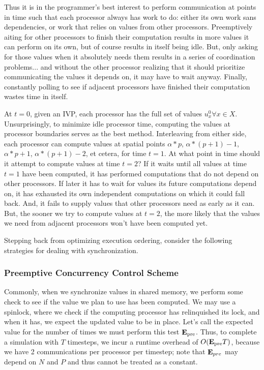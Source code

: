 Thus it is in the programmer's best interest to perform communication at points
in time such that each processor always has work to do: either its own work sans
dependencies, or work that relies on values from other processors. Preemptively
aiting for other processors to finish their computation results in more values
it can perform on its own, but of course results in itself being idle. But, only
asking for those values when it absolutely needs them results in a series of
coordination problems... and without the other processor realizing that it
should prioritize communicating the values it depends on, it may have to wait
anyway. Finally, constantly polling to see if adjacent processors have finished
their computation wastes time in itself.

At $t=0$, given an IVP, each processor has the full set of values $u^{0}_{x}
\forall x \in X$. Unsurprisingly, to minimize idle processor time, computing the
values at processor boundaries serves as the best method. Interleaving from
either side, each processor can compute values at spatial points $\alpha*p$,
$\alpha*(p+1) - 1$, $\alpha*p + 1$, $\alpha*(p+1) - 2$, et cetera, for time $t =
1$. At what point in time should it attempt to compute values at time $t = 2$?
If it waits until all values at time $t = 1$ have been computed, it has
performed computations that do not depend on other processors. If later it has
to wait for values its future computations depend on, it has exhausted its own
independent computations on which it could fall back. And, it fails to supply
values that other processors need as early as it can. But, the sooner we try to
compute values at $t = 2$, the more likely that the values we need from adjacent
processors won't have been computed yet.

Stepping back from optimizing execution ordering, consider the following
strategies for dealing with synchronization.

\subsubsection{Preemptive Concurrency Control Scheme}
Commonly, when we synchronize values in shared memory, we perform some check to
see if the value we plan to use has been computed. We may use a spinlock, where
we check if the computing processor has relinquished its lock, and when it has,
we expect the updated value to be in place. Let's call the expected value for
the number of times we must perform this test $\mathbf{E}_\text{pre}$. Thus, to
complete a simulation with $T$ timesteps, we incur a runtime overhead of
$O(\mathbf{E}_\text{pre} T)$, because we have 2 communications per processor per
timestep; note that $\mathbf{E}_{pre}$ may depend on $N$ and $P$ and thus cannot be treated
as a constant.

